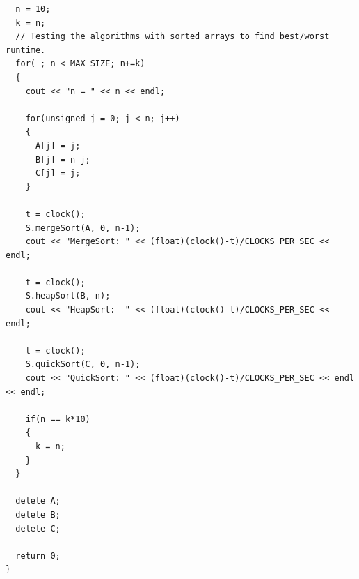 \documentclass[a4paper]{article}
\begin{document}
\begin{verbatim}
  n = 10;
  k = n;
  // Testing the algorithms with sorted arrays to find best/worst runtime.
  for( ; n < MAX_SIZE; n+=k)
  {
    cout << "n = " << n << endl;

    for(unsigned j = 0; j < n; j++)
    {
      A[j] = j;
      B[j] = n-j;
      C[j] = j;
    }

    t = clock();
    S.mergeSort(A, 0, n-1);
    cout << "MergeSort: " << (float)(clock()-t)/CLOCKS_PER_SEC << endl;

    t = clock();
    S.heapSort(B, n);
    cout << "HeapSort:  " << (float)(clock()-t)/CLOCKS_PER_SEC << endl;

    t = clock();
    S.quickSort(C, 0, n-1);
    cout << "QuickSort: " << (float)(clock()-t)/CLOCKS_PER_SEC << endl << endl;

    if(n == k*10)
    {
      k = n;
    }
  }

  delete A;
  delete B;
  delete C;

  return 0;
}
    \end{verbatim}
\end{document}
